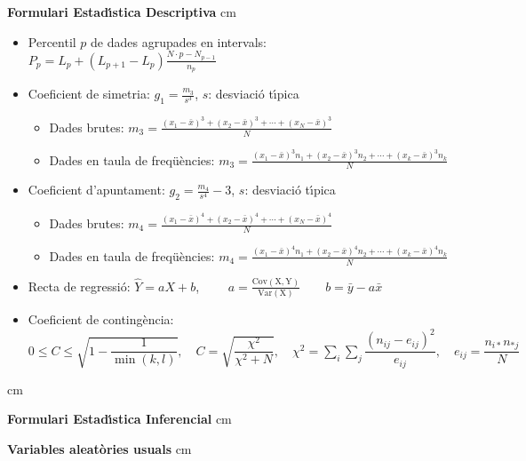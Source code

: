 \documentclass[a4paper,12pt]{article}
\begin{document}
{\footnotesize

\textbf{Formulari Estad\'{\i}stica Descriptiva}
 cm

\begin{itemize}
\item Percentil $p$ de dades agrupades en intervals:
$
\displaystyle
P_p=L_p + (L_{p+1}-L_p) \frac{N \cdot p - N_{p-1}}{n_p}
$

\item Coeficient de simetria: $g_1=\frac{m_3}{s^3}$, $s$: desviaci\'o t\'{\i}pica
\begin{itemize}
\item Dades brutes:
$
\displaystyle
m_3=\frac{(x_1-\bar{x})^3+(x_2-\bar{x})^3+\cdots+(x_N-\bar{x})^3}{N}
$
\item Dades en taula de freq\"u\`encies:
$
\displaystyle
m_3=\frac{(x_1-\bar{x})^3 n_1+(x_2-\bar{x})^3 n_2+\cdots+(x_k-\bar{x})^3 n_k}{N}
$
\end{itemize}

\item Coeficient d'apuntament: $g_2=\frac{m_4}{s^4} - 3$, $s$: desviaci\'o t\'{\i}pica
\begin{itemize}
\item Dades brutes:
$
\displaystyle
m_4=\frac{(x_1-\bar{x})^4+(x_2-\bar{x})^4+\cdots+(x_N-\bar{x})^4}{N}
$
\item Dades en taula de freq\"u\`encies:
$
\displaystyle
m_4=\frac{(x_1-\bar{x})^4 n_1+(x_2-\bar{x})^4 n_2+\cdots+(x_k-\bar{x})^4 n_k}{N}
$
\end{itemize}

\item Recta de regressi\'o: $\hat{Y}=aX+b$, $\qquad 
a=\frac{\mathrm{Cov(X, Y)}}{\mathrm{Var(X)}} \qquad b=\bar{y}-a \bar{x}
$

\item Coeficient de conting\`encia:
$
\displaystyle
0\leq C \leq \sqrt{1-\dfrac{1}{\min(k,l)}},\quad C=\sqrt{\dfrac {\chi^2}{\chi^2+N}},\quad \chi^2=\sum_i \sum_j \dfrac {(n_{ij}-e_{ij})^2}{e_{ij}},\quad e_{ij}=\dfrac {n_{i*}n_{*j}}{N}
$


\end{itemize}


 cm


\textbf{Formulari Estad\'{\i}stica Inferencial}
 cm

\textbf{Variables aleat\`ories usuals}
 cm

}
\end{document}
